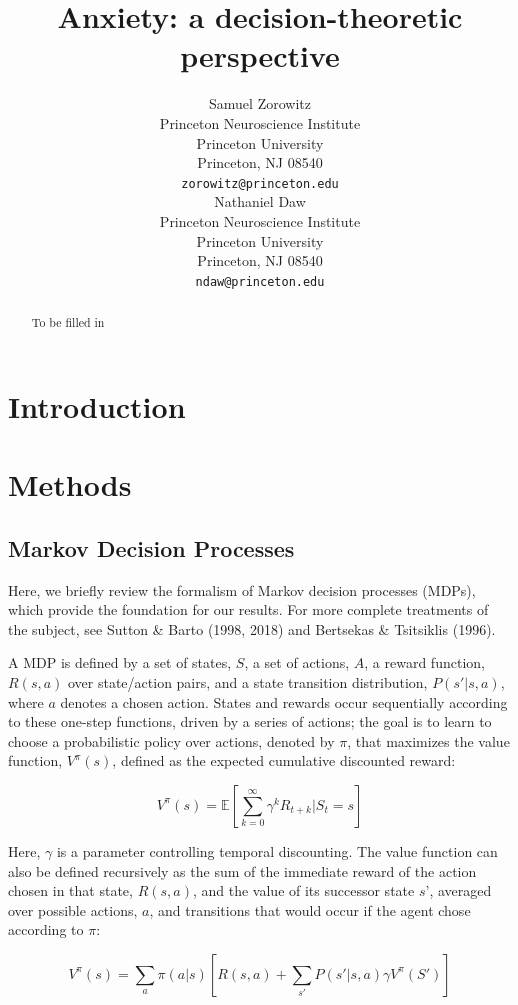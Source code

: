 \documentclass[11pt]{article} %
\title{Anxiety: a decision-theoretic perspective}
\author{
Samuel Zorowitz \\
Princeton Neuroscience Institute\\
Princeton University\\
Princeton, NJ 08540 \\
\texttt{zorowitz@princeton.edu} \\
\And
Nathaniel Daw \\
Princeton Neuroscience Institute\\
Princeton University\\
Princeton, NJ 08540 \\
\texttt{ndaw@princeton.edu} \\
}
\begin{document}
\maketitle

\begin{abstract}
To be filled in
\end{abstract}


\startmain %

\section{Introduction}


\section{Methods}

\subsection{Markov Decision Processes}

Here, we briefly review the formalism of Markov decision processes (MDPs), which
provide the foundation for our results. For more complete treatments of the
subject, see Sutton \& Barto (1998, 2018) and Bertsekas \& Tsitsiklis (1996).

A MDP is defined by a set of states, $S$, a set of actions, $A$, a reward
function, $R(s,a)$ over state/action pairs, and a state transition distribution,
$P(s'|s,a)$, where $a$ denotes a chosen action. States and rewards occur
sequentially according to these one-step functions, driven by a series of
actions; the goal is to learn to choose a probabilistic policy over actions,
denoted by $\pi$, that maximizes the value function, $V^\pi(s)$, defined as the
expected cumulative discounted reward:

$$ V^\pi(s) = \mathbb{E} \left[ \sum^{\infty}_{k=0} \gamma^k R_{t+k} | S_t = s \right] $$

Here, $\gamma$ is a parameter controlling temporal discounting. The value function
can also be defined recursively as the sum of the immediate reward of the action
chosen in that state, $R(s, a)$, and the value of its successor state $s’$,
averaged over possible actions, $a$, and transitions that would occur if the agent
chose according to $\pi$:

$$ V^\pi(s) = \sum_a \pi(a|s) \left[ R(s,a) + \sum_{s'} P(s'|s,a) \gamma V^\pi (S') \right] $$
\end{document}
